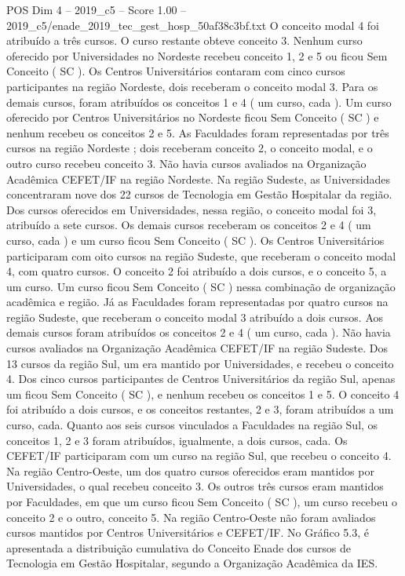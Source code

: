 \begin{textsample}{POS Dim 4 – 2019\_c5 – Score 1.00 – 2019\_c5/enade\_2019\_tec\_gest\_hosp\_50af38c3bf.txt}
O conceito modal 4 foi atribuído a três cursos.
O curso restante obteve conceito 3.
Nenhum curso oferecido por Universidades no Nordeste recebeu conceito 1, 2 e 5 ou ficou Sem Conceito ( SC ).
Os Centros Universitários contaram com cinco cursos participantes na região Nordeste, dois receberam o conceito modal 3.
Para os demais cursos, foram atribuídos os conceitos 1 e 4 ( um curso, cada ).
Um curso oferecido por Centros Universitários no Nordeste ficou Sem Conceito ( SC ) e nenhum recebeu os conceitos 2 e 5.
As Faculdades foram representadas por três cursos na região Nordeste ; dois receberam conceito 2, o conceito modal, e o outro curso recebeu conceito 3.
Não havia cursos avaliados na Organização Acadêmica CEFET/IF na região Nordeste.
Na região Sudeste, as Universidades concentraram nove dos 22 cursos de Tecnologia em Gestão Hospitalar da região.
Dos cursos oferecidos em Universidades, nessa região, o conceito modal foi 3, atribuído a sete cursos.
Os demais cursos receberam os conceitos 2 e 4 ( um curso, cada ) e um curso ficou Sem Conceito ( SC ).
Os Centros Universitários participaram com oito cursos na região Sudeste, que receberam o conceito modal 4, com quatro cursos.
O conceito 2 foi atribuído a dois cursos, e o conceito 5, a um curso.
Um curso ficou Sem Conceito ( SC ) nessa combinação de organização acadêmica e região.
Já as Faculdades foram representadas por quatro cursos na região Sudeste, que receberam o conceito modal 3 atribuído a dois cursos.
Aos demais cursos foram atribuídos os conceitos 2 e 4 ( um curso, cada ).
Não havia cursos avaliados na Organização Acadêmica CEFET/IF na região Sudeste.
Dos 13 cursos da região Sul, um era mantido por Universidades, e recebeu o conceito 4.
Dos cinco cursos participantes de Centros Universitários da região Sul, apenas um ficou Sem Conceito ( SC ), e nenhum recebeu os conceitos 1 e 5.
O conceito 4 foi atribuído a dois cursos, e os conceitos restantes, 2 e 3, foram atribuídos a um curso, cada.
Quanto aos seis cursos vinculados a Faculdades na região Sul, os conceitos 1, 2 e 3 foram atribuídos, igualmente, a dois cursos, cada.
Os CEFET/IF participaram com um curso na região Sul, que recebeu o conceito 4.
Na região Centro-Oeste, um dos quatro cursos oferecidos eram mantidos por Universidades, o qual recebeu conceito 3.
Os outros três cursos eram mantidos por Faculdades, em que um curso ficou Sem Conceito ( SC ), um curso recebeu o conceito 2 e o outro, conceito 5.
Na região Centro-Oeste não foram avaliados cursos mantidos por Centros Universitários e CEFET/IF.
No Gráfico 5.3, é apresentada a distribuição cumulativa do Conceito Enade dos cursos de Tecnologia em Gestão Hospitalar, segundo a Organização Acadêmica da IES.

\end{textsample}

